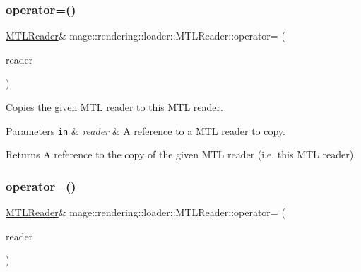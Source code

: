 \subsubsection{\texorpdfstring{operator=()}{operator=()}\hspace{0.1cm}{\footnotesize\ttfamily [1/2]}}
{\footnotesize\ttfamily \mbox{\hyperlink{classmage_1_1rendering_1_1loader_1_1_m_t_l_reader}{M\+T\+L\+Reader}}\& mage\+::rendering\+::loader\+::\+M\+T\+L\+Reader\+::operator= (\begin{DoxyParamCaption}\item[{const \mbox{\hyperlink{classmage_1_1rendering_1_1loader_1_1_m_t_l_reader}{M\+T\+L\+Reader}} \&}]{reader }\end{DoxyParamCaption})\hspace{0.3cm}{\ttfamily [delete]}}

Copies the given M\+TL reader to this M\+TL reader.


\begin{DoxyParams}[1]{Parameters}
\mbox{\tt in}  & {\em reader} & A reference to a M\+TL reader to copy. \\
\hline
\end{DoxyParams}
\begin{DoxyReturn}{Returns}
A reference to the copy of the given M\+TL reader (i.\+e. this M\+TL reader). 
\end{DoxyReturn}
\mbox{\label{classmage_1_1rendering_1_1loader_1_1_m_t_l_reader_a057f38f1f720e040b2ab5fa08f42fac4}} 
\subsubsection{\texorpdfstring{operator=()}{operator=()}\hspace{0.1cm}{\footnotesize\ttfamily [2/2]}}
{\footnotesize\ttfamily \mbox{\hyperlink{classmage_1_1rendering_1_1loader_1_1_m_t_l_reader}{M\+T\+L\+Reader}}\& mage\+::rendering\+::loader\+::\+M\+T\+L\+Reader\+::operator= (\begin{DoxyParamCaption}\item[{\mbox{\hyperlink{classmage_1_1rendering_1_1loader_1_1_m_t_l_reader}{M\+T\+L\+Reader}} \&\&}]{reader }\end{DoxyParamCaption})\hspace{0.3cm}{\ttfamily [delete]}}

